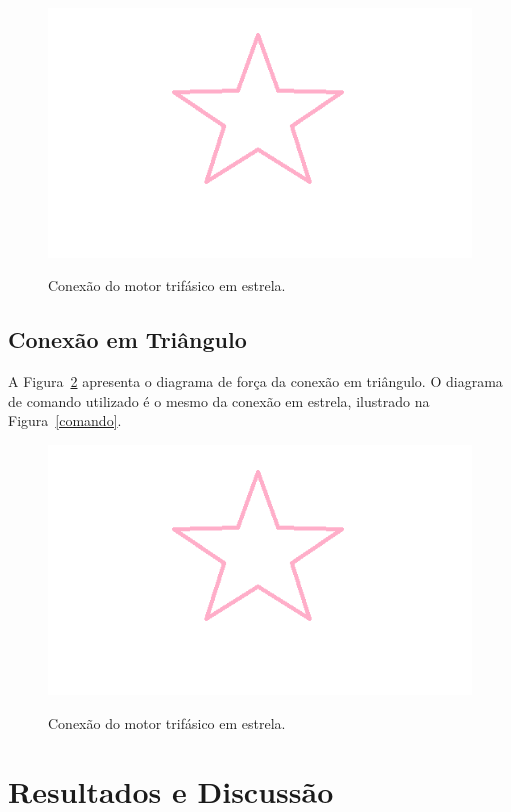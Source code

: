 \documentclass[twocolumn]{article}
\begin{document}
\begin{figure}[!htb]
	\centering\includegraphics[width=\columnwidth]{diagrama_estrela}\\
	\caption{Conexão do motor trifásico em estrela. }\label{estrela}
\end{figure}

\subsection{Conexão em Triângulo}
A Figura~\ref{triangulo} apresenta o diagrama de força da conexão em triângulo. O diagrama de comando utilizado é o mesmo da conexão em estrela, ilustrado na Figura~\ref{comando}.

\begin{figure}[!htb]
	\centering\includegraphics[width=\columnwidth]{diagrama_estrela}\\
	\caption{Conexão do motor trifásico em estrela. }\label{triangulo}
\end{figure}

\section{Resultados e Discussão}
\end{document}
